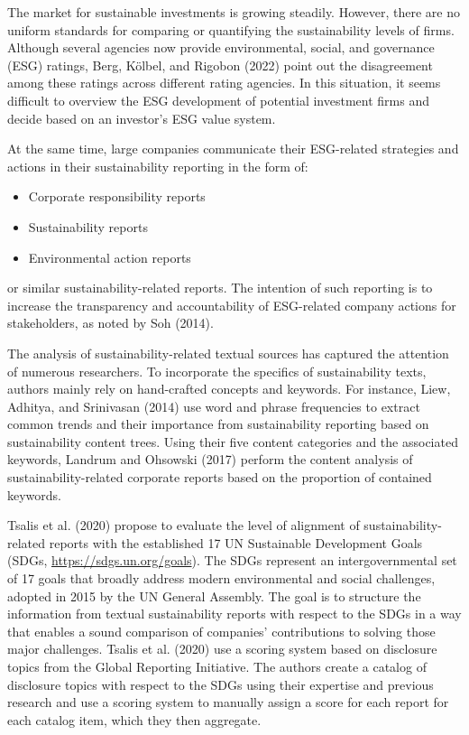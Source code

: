 \documentclass[
]{article}
\providecommand{\tightlist}{%
  \setlength{\itemsep}{0pt}\setlength{\parskip}{0pt}}
\begin{document}
The market for sustainable investments is growing steadily. However, there are no uniform standards for comparing or quantifying the sustainability levels of firms. Although several agencies now provide environmental, social, and governance (ESG) ratings, Berg, Kölbel, and Rigobon (2022) point out the disagreement among these ratings across different rating agencies. In this situation, it seems difficult to overview the ESG development of potential investment firms and decide based on an investor's ESG value system.

At the same time, large companies communicate their ESG-related strategies and actions in their sustainability reporting in the form of:

\begin{itemize}
\tightlist
\item
  Corporate responsibility reports
\item
  Sustainability reports
\item
  Environmental action reports
\end{itemize}

or similar sustainability-related reports. The intention of such reporting is to increase the transparency and accountability of ESG-related company actions for stakeholders, as noted by Soh (2014).

The analysis of sustainability-related textual sources has captured the attention of numerous researchers. To incorporate the specifics of sustainability texts, authors mainly rely on hand-crafted concepts and keywords. For instance, Liew, Adhitya, and Srinivasan (2014) use word and phrase frequencies to extract common trends and their importance from sustainability reporting based on sustainability content trees. Using their five content categories and the associated keywords, Landrum and Ohsowski (2017) perform the content analysis of sustainability-related corporate reports based on the proportion of contained keywords.

Tsalis et al. (2020) propose to evaluate the level of alignment of sustainability-related reports with the established 17 UN Sustainable Development Goals (SDGs, \url{https://sdgs.un.org/goals}). The SDGs represent an intergovernmental set of 17 goals that broadly address modern environmental and social challenges, adopted in 2015 by the UN General Assembly. The goal is to structure the information from textual sustainability reports with respect to the SDGs in a way that enables a sound comparison of companies' contributions to solving those major challenges. Tsalis et al. (2020) use a scoring system based on disclosure topics from the Global Reporting Initiative. The authors create a catalog of disclosure topics with respect to the SDGs using their expertise and previous research and use a scoring system to manually assign a score for each report for each catalog item, which they then aggregate.
\end{document}
